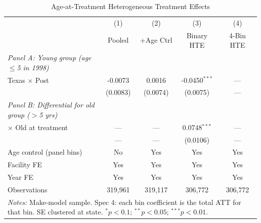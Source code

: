 \begin{table}[htbp]\centering
\caption{Age-at-Treatment Heterogeneous Treatment Effects}
\label{tbl:age_treat_hte}
\begin{tabular}{lcccc}\toprule
 & (1) & (2) & (3) & (4)\\
 & Pooled & +Age Ctrl & Binary HTE & 4-Bin HTE \\
\midrule
\textit{Panel A: Young group (age $\leq$5 in 1998)} & & & & \\
Texas $\times$ Post & -0.0073 & 0.0016 & -0.0450$^{***}$ & --- \\
 & (0.0083) & (0.0074) & (0.0075) & --- \\
\addlinespace
\textit{Panel B: Differential for old group ($>$5 yrs)} & & & & \\
$\times$ Old at treatment & --- & --- & 0.0748$^{***}$ & --- \\
 & --- & --- & (0.0106) & --- \\
\midrule
Age control (panel bins) & No & Yes & Yes & Yes \\
Facility FE & Yes & Yes & Yes & Yes \\
Year FE & Yes & Yes & Yes & Yes \\\midrule
Observations & 319,961 & 319,117 & 306,772 & 306,772 \\
\bottomrule
\multicolumn{5}{p{0.95\textwidth}}{\footnotesize \textit{Notes:} 
Make-model sample. Spec 4: each bin coefficient is the total ATT for that bin. 
SE clustered at state. $^{*}p<0.1$; $^{**}p<0.05$; $^{***}p<0.01$.}
\end{tabular}\end{table}
